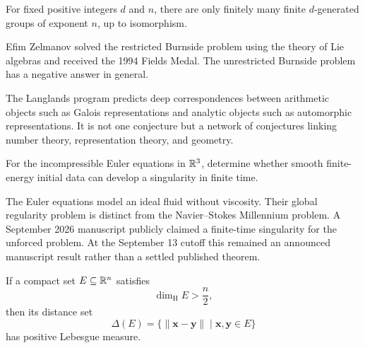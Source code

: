     \begin{theorem}
        For fixed positive integers $d$ and $n$, there are only finitely many
        finite $d$-generated groups of exponent $n$, up to isomorphism.
    \end{theorem}

    \begin{remark}
        Efim Zelmanov solved the restricted Burnside problem using the theory of
        Lie algebras and received the 1994 Fields Medal. The unrestricted
        Burnside problem has a negative answer in general.
    \end{remark}

    \begin{fact}
        The Langlands program predicts deep correspondences between arithmetic
        objects such as Galois representations and analytic objects such as
        automorphic representations. It is not one conjecture but a network of
        conjectures linking number theory, representation theory, and geometry.
    \end{fact}

    \begin{openproblem}
        For the incompressible Euler equations in $\mathbb{R}^3$, determine whether
        smooth finite-energy initial data can develop a singularity in finite
        time.
    \end{openproblem}

    \begin{remark}
        The Euler equations model an ideal fluid without viscosity. Their global
        regularity problem is distinct from the Navier--Stokes Millennium
        problem. A September 2026 manuscript publicly claimed a finite-time
        singularity for the unforced problem. At the September 13 cutoff this
        remained an announced manuscript result rather than a settled published
        theorem.
    \end{remark}

    \begin{conjecture}
        If a compact set $E\subseteq\mathbb{R}^n$ satisfies
        \[
            \dim_{\mathrm{H}}E>\frac{n}{2},
        \]
        then its distance set
        \[
            \Delta(E)
            =
            \{\|\mathbf{x}-\mathbf{y}\|\mid\mathbf{x},\mathbf{y}\in E\}
        \]
        has positive Lebesgue measure.
    \end{conjecture}

